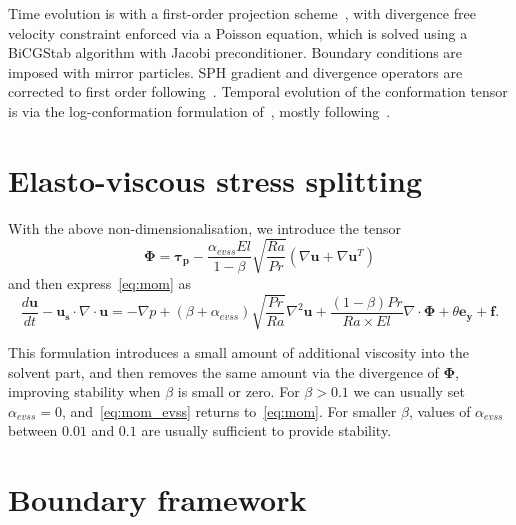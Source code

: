 \documentclass[notitlepage]{revtex4-2}
\begin{document}
Time evolution is with a first-order projection scheme~\cite{chorin_1968}, with divergence free velocity constraint enforced via a Poisson equation, which is solved using a BiCGStab algorithm with Jacobi preconditioner. Boundary conditions are imposed with mirror particles. SPH gradient and divergence operators are corrected to first order following~\cite{bonet_lok}. Temporal evolution of the conformation tensor is via the log-conformation formulation of~\cite{fattal_2004,fattal_2005}, mostly following~\cite{lopez_2019}.

\section{Elasto-viscous stress splitting}

With the above non-dimensionalisation, we introduce the tensor
\begin{equation}\bm{\Phi}=\bm{\tau_{p}}-\frac{\alpha_{evss}El}{1-\beta}\sqrt{\frac{Ra}{Pr}}\left(\nabla\bm{u}+\nabla\bm{u}^{T}\right)\end{equation}
and then express~\eqref{eq:mom} as
\begin{equation}\frac{d\bm{u}}{dt}-\bm{u_{s}}\cdot\nabla\cdot\bm{u}=-\nabla{p}+\left(\beta+\alpha_{evss}\right)\sqrt{\frac{Pr}{Ra}}\nabla^{2}\bm{u}+\frac{\left(1-\beta\right)Pr}{Ra\times{El}}\nabla\cdot\bm{\Phi}+\theta\bm{e_{y}}+\bm{f}\label{eq:mom_evss}.\end{equation}

This formulation introduces a small amount of additional viscosity into the solvent part, and then removes the same amount via the divergence of $\bm{\Phi}$, improving stability when $\beta$ is small or zero. For $\beta>0.1$ we can usually set $\alpha_{evss}=0$, and~\eqref{eq:mom_evss} returns to~\eqref{eq:mom}. For smaller $\beta$, values of $\alpha_{evss}$ between $0.01$ and $0.1$ are usually sufficient to provide stability.

\section{Boundary framework}
\end{document}
